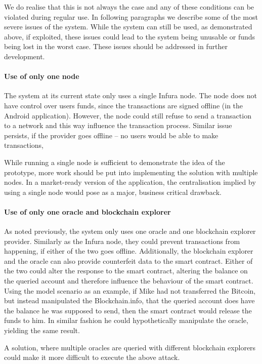 We do realise that this is not always the case and any of these conditions can be violated during regular use. In following paragraphs we describe some of the most severe issues of the system. While the system can still be used, as demonstrated above, if exploited, these issues could lead to the system being unusable or funds being lost in the worst case. These issues should be addressed in further development.

\paragraph{Use of only one node}
The system at its current state only uses a single Infura node. The node does not have control over users funds, since the transactions are signed offline (in the Android application). However, the node could still refuse to send a transaction to a network and this way influence the transaction process. Similar issue persists, if the provider goes offline -- no users would be able to make transactions,

While running a single node is sufficient to demonstrate the idea of the prototype, more work should be put into implementing the solution with multiple nodes. In a market-ready version of the application, the centralisation implied by using a single node would pose as a major, business critical drawback.
% 
\paragraph{Use of only one oracle and blockchain explorer}
As noted previously, the system only uses one oracle and one blockchain explorer provider. Similarly as the Infura node, they could prevent transactions from happening, if either of the two goes offline. Additionally, the blockchain explorer and the oracle can also provide counterfeit data to the smart contract. Either of the two could alter the response to the smart contract, altering the balance on the queried account and therefore influence the behaviour of the smart contract. Using the model scenario as an example, if Mike had not transferred the Bitcoin, but instead manipulated the Blockchain.info, that the queried account does have the balance he was supposed to send, then the smart contract would release the funds to him. In similar fashion he could hypothetically manipulate the oracle, yielding the same result.

A solution, where multiple oracles are queried with different blockchain explorers could make it more difficult to execute the above attack.
% 
